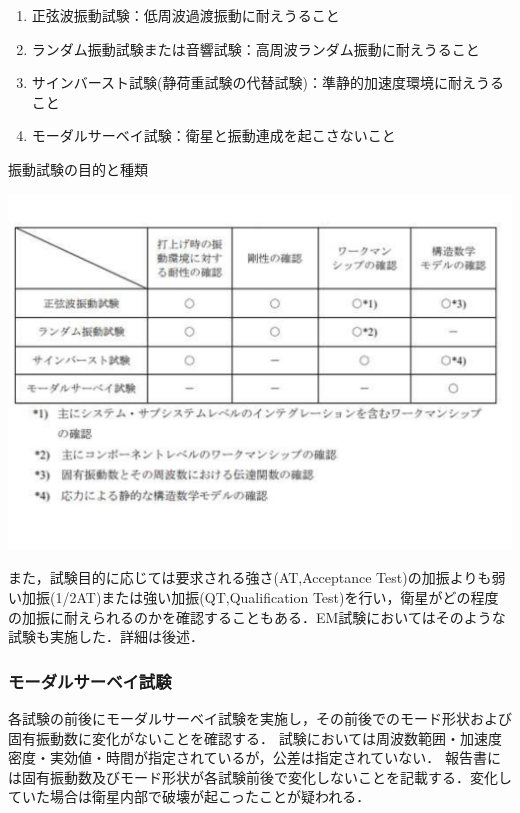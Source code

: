 \begin{enumerate}
	\item 正弦波振動試験：低周波過渡振動に耐えうること
	\item ランダム振動試験または音響試験：高周波ランダム振動に耐えうること
	\item サインバースト試験(静荷重試験の代替試験)：準静的加速度環境に耐えうること
	\item モーダルサーベイ試験：衛星と振動連成を起こさないこと
\end{enumerate}

\begin{table}[H]
	\centering
	\caption{振動試験の目的と種類\cite{vibration_test_handbook}}
	\includegraphics[width=0.9\linewidth]{04/fig/t4-3-2.pdf}
	\label{table4-3-2}
\end{table}


また，試験目的に応じては要求される強さ(AT,Acceptance Test)の加振よりも弱い加振(1/2AT)または強い加振(QT,Qualification Test)を行い，衛星がどの程度の加振に耐えられるのかを確認することもある．EM試験においてはそのような試験も実施した．詳細は後述．

\subsubsection{モーダルサーベイ試験}
各試験の前後にモーダルサーベイ試験を実施し，その前後でのモード形状および固有振動数に変化がないことを確認する．
試験においては周波数範囲・加速度密度・実効値・時間が指定されているが，公差は指定されていない．
報告書には固有振動数及びモード形状が各試験前後で変化しないことを記載する．変化していた場合は衛星内部で破壊が起こったことが疑われる．

